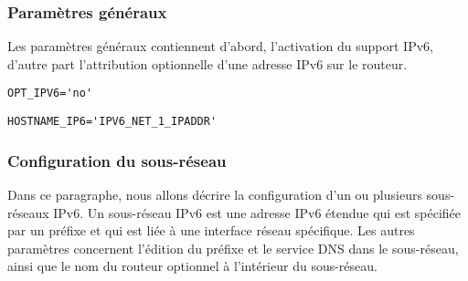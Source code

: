 \subsubsection{Paramètres généraux}

Les paramètres généraux contiennent d'abord, l'activation du support IPv6,
d'autre part l'attribution optionnelle d'une adresse IPv6 sur le routeur.

\begin{description}
\verb*?OPT_IPV6='no'?

\verb*?HOSTNAME_IP6='IPV6_NET_1_IPADDR'?
\end{description}

\subsubsection{Configuration du sous-réseau}

Dans ce paragraphe, nous allons décrire la configuration d'un ou plusieurs
sous-réseaux IPv6. Un sous-réseau IPv6 est une adresse IPv6 étendue qui est
spécifiée par un préfixe et qui est liée à une interface réseau spécifique. Les
autres paramètres concernent l'édition du préfixe et le service DNS dans le
sous-réseau, ainsi que le nom du routeur optionnel à l'intérieur du sous-réseau.

